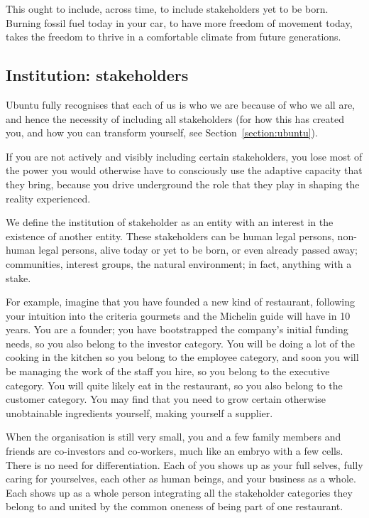 This ought to include, across time, to include stakeholders yet to be born. Burning fossil fuel today in your car, to have more freedom of movement today, takes the freedom to thrive in a comfortable climate from future generations. 




\subsection{Institution: stakeholders}
\label{section-stakeholder-institution}


Ubuntu fully recognises that each of us is who we are because of who we all are, and hence the necessity of including all stakeholders (for how this has created you, and how you can transform yourself, see Section~\ref{section:ubuntu}). 


If you are not actively and visibly including certain stakeholders, you lose most of the power you would otherwise have to consciously use the adaptive capacity that they bring, because you drive underground the role that they play in shaping the reality experienced.


We define the institution of stakeholder as an entity with an interest in the existence of another entity. These stakeholders can be human legal persons, non-human legal persons, alive today or yet to be born, or even already passed away; communities, interest groups, the natural environment; in fact, anything with a stake.


For example, imagine that you have founded a new kind of restaurant, following your intuition into the criteria gourmets and the Michelin guide will have in 10 years. You are a founder; you have bootstrapped the company’s initial funding needs, so you also belong to the investor category. You will be doing a lot of the cooking in the kitchen so you belong to the employee category, and soon you will be managing the work of the staff you hire, so you belong to the executive category. You will quite likely eat in the restaurant, so you also belong to the customer category. You may find that you need to grow certain otherwise unobtainable ingredients yourself, making yourself a supplier.


When the organisation is still very small, you and a few family members and friends are co-investors and co-workers, much like an embryo with a few cells. There is no need for differentiation. Each of you shows up as your full selves, fully caring for yourselves, each other as human beings, and your business as a whole. Each shows up as a whole person integrating all the stakeholder categories they belong to and united by the common oneness of being part of one restaurant.


